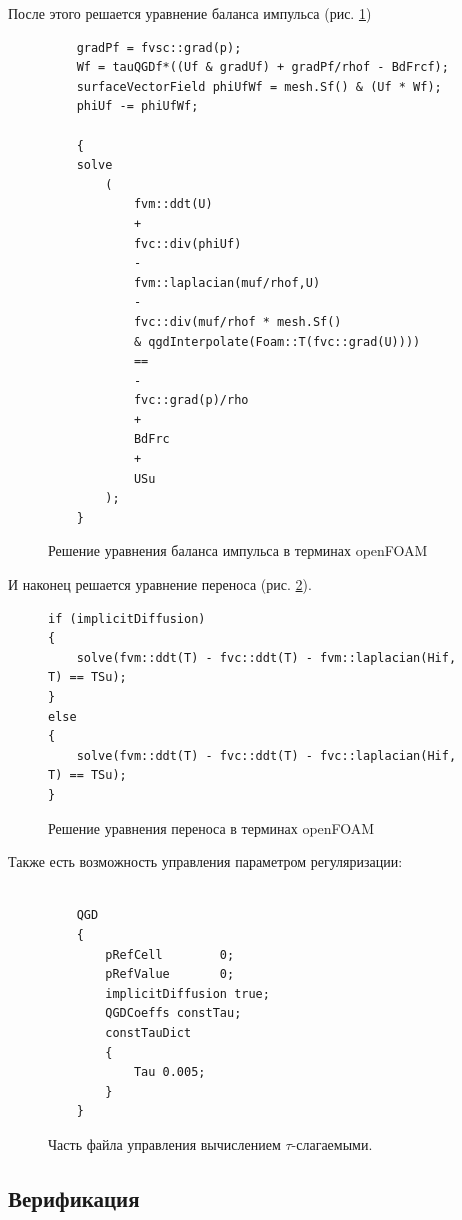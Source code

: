 После этого решается уравнение баланса импульса (рис. \ref{fig:velList})

\begin{figure}
\centering
\begin{lstlisting}
    gradPf = fvsc::grad(p);
    Wf = tauQGDf*((Uf & gradUf) + gradPf/rhof - BdFrcf);
    surfaceVectorField phiUfWf = mesh.Sf() & (Uf * Wf);
    phiUf -= phiUfWf;

    {
    solve
        (
            fvm::ddt(U)
            +
            fvc::div(phiUf)
            -
            fvm::laplacian(muf/rhof,U)
            -
            fvc::div(muf/rhof * mesh.Sf() 
            & qgdInterpolate(Foam::T(fvc::grad(U))))
            ==
            -
            fvc::grad(p)/rho
            +
            BdFrc
            +
            USu
        );
    }
\end{lstlisting}
\caption{Решение уравнения баланса импульса в терминах openFOAM}
\label{fig:velList}
\end{figure}

И наконец решается уравнение переноса (рис. \ref{fig:trans}).


\begin{figure}
    \centering
\begin{lstlisting}
if (implicitDiffusion)
{
    solve(fvm::ddt(T) - fvc::ddt(T) - fvm::laplacian(Hif, T) == TSu);
}
else
{
    solve(fvm::ddt(T) - fvc::ddt(T) - fvc::laplacian(Hif, T) == TSu);
}
\end{lstlisting}    
\caption{Решение уравнения переноса в терминах openFOAM}
\label{fig:trans}
\end{figure}

Также есть возможность управления параметром регуляризации:

\begin{figure}
    \centering
\begin{lstlisting}

    QGD
    {
        pRefCell        0;
        pRefValue       0;
        implicitDiffusion true;
        QGDCoeffs constTau;
        constTauDict
        {
            Tau 0.005;
        }
    }

\end{lstlisting}    
    \caption{Часть файла управления вычислением $\tau$-слагаемыми.}
    \label{fig:QGD}
\end{figure}

\subsection{Верификация}

